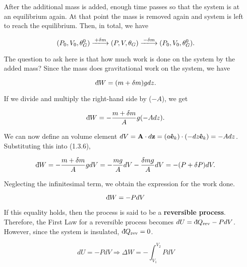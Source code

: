         After the additional mass is added, enough time passes so that the system is at an equilibrium again. At that point the mass is removed again and system is left to reach the equilibrium. Then, in total, we have
        
        \begin{equation*}
            (P_0,V_0,\theta_G^0) \xlongrightarrow[]{+\delta m} (P,V,\theta_G) \xlongrightarrow[]{-\delta m} (P_0,V_0,\theta_G^0).
        \end{equation*}
        
        The question to ask here is that how much work is done on the system by the added mass? Since the mass does gravitational work on the system, we have
        
        \begin{equation}
            \text{d}\hspace*{-0.13em}\bar{}\hspace*{0.1em} W = (m+\delta m)gdz.
        \end{equation}
        
        If we divide and multiply the right-hand side by ($-A$), we get
        
        \begin{equation}
            \text{d}\hspace*{-0.13em}\bar{}\hspace*{0.1em} W = -\frac{m+\delta m}{A}g(-Adz).
        \end{equation}
        
        We can now define an volume element $dV = \mathbf{A}\cdot d\mathbf{z} = (a\mathbf{\hat{e}}_{k})\cdot(-dz\mathbf{\hat{e}}_{k})=-Adz$. Substituting this into (1.3.6),
        
        \begin{equation}
            \text{d}\hspace*{-0.13em}\bar{}\hspace*{0.1em} W = -\frac{m+\delta m}{A}gdV = -\frac{mg}{A}dV - \frac{\delta mg}{A}dV = -(P+\delta P)dV.
        \end{equation}
        
        Neglecting the infinitesimal term, we obtain the expression for the work done.
        
        \begin{equation}
            \text{d}\hspace*{-0.13em}\bar{}\hspace*{0.1em} W = -PdV
        \end{equation}
        
        If this equality holds, then the process is said to be a \textbf{reversible process}. Therefore, the First Law for a reversible process becomes $dU = \text{d}\hspace*{-0.13em}\bar{}\hspace*{0.1em} Q_{\text{rev}} -PdV$. However, since the system is insulated, $\text{d}\hspace*{-0.13em}\bar{}\hspace*{0.1em} Q_\text{rev}=0$.
        
        \begin{equation}
            dU = -PdV \Rightarrow \Delta W = -\int_{V_1}^{V_2}PdV
            \label{eq:work}
        \end{equation}
        
